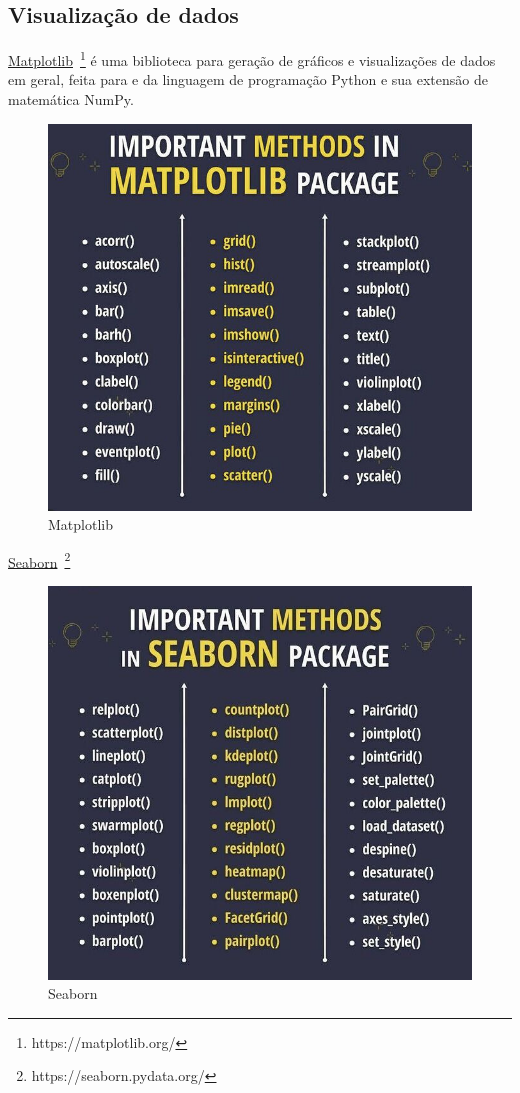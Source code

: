 \subsection*{Visualização de dados}

\underline{Matplotlib}~\footnote{https://matplotlib.org/} é uma biblioteca para geração de gráficos e visualizações de dados em geral, feita para e da linguagem de programação Python e sua extensão de matemática NumPy.

\begin{figure}[!htp]
    \centering
    \includegraphics[scale=.9]{../img/python/matplotlib.jpeg}
    \caption{Matplotlib}
    \label{img:matplotlib}
\end{figure}


\underline{Seaborn}~\footnote{https://seaborn.pydata.org/}

\begin{figure}[!htp]
    \centering
    \includegraphics[scale=.5]{../img/python/seaborn.jpeg}
    \caption{Seaborn}
    \label{img:seaborn}
\end{figure}
